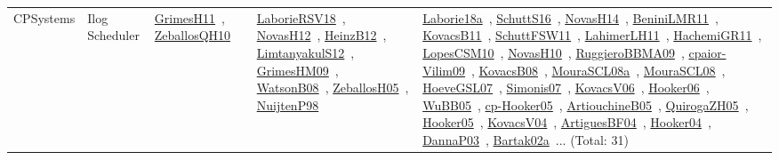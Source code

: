 {\begin{longtable}{lp{3cm}>{\raggedright\arraybackslash}p{6cm}>{\raggedright\arraybackslash}p{6cm}>{\raggedright\arraybackslash}p{8cm}}
CPSystems & Ilog Scheduler & \href{papers/GrimesH11.pdf}{GrimesH11}~\cite{GrimesH11}, \href{articles/ZeballosQH10.pdf}{ZeballosQH10}~\cite{ZeballosQH10} & \href{articles/LaborieRSV18.pdf}{LaborieRSV18}~\cite{LaborieRSV18}, \href{articles/NovasH12.pdf}{NovasH12}~\cite{NovasH12}, \href{papers/HeinzB12.pdf}{HeinzB12}~\cite{HeinzB12}, \href{articles/LimtanyakulS12.pdf}{LimtanyakulS12}~\cite{LimtanyakulS12}, \href{papers/GrimesHM09.pdf}{GrimesHM09}~\cite{GrimesHM09}, \href{papers/WatsonB08.pdf}{WatsonB08}~\cite{WatsonB08}, \href{articles/ZeballosH05.pdf}{ZeballosH05}~\cite{ZeballosH05}, \href{articles/NuijtenP98.pdf}{NuijtenP98}~\cite{NuijtenP98} & \href{papers/Laborie18a.pdf}{Laborie18a}~\cite{Laborie18a}, \href{papers/SchuttS16.pdf}{SchuttS16}~\cite{SchuttS16}, \href{articles/NovasH14.pdf}{NovasH14}~\cite{NovasH14}, \href{articles/BeniniLMR11.pdf}{BeniniLMR11}~\cite{BeniniLMR11}, \href{articles/KovacsB11.pdf}{KovacsB11}~\cite{KovacsB11}, \href{articles/SchuttFSW11.pdf}{SchuttFSW11}~\cite{SchuttFSW11}, \href{papers/LahimerLH11.pdf}{LahimerLH11}~\cite{LahimerLH11}, \href{articles/HachemiGR11.pdf}{HachemiGR11}~\cite{HachemiGR11}, \href{articles/LopesCSM10.pdf}{LopesCSM10}~\cite{LopesCSM10}, \href{articles/NovasH10.pdf}{NovasH10}~\cite{NovasH10}, \href{articles/RuggieroBBMA09.pdf}{RuggieroBBMA09}~\cite{RuggieroBBMA09}, \href{papers/cpaior-Vilim09.pdf}{cpaior-Vilim09}~\cite{cpaior-Vilim09}, \href{articles/KovacsB08.pdf}{KovacsB08}~\cite{KovacsB08}, \href{papers/MouraSCL08a.pdf}{MouraSCL08a}~\cite{MouraSCL08a}, \href{papers/MouraSCL08.pdf}{MouraSCL08}~\cite{MouraSCL08}, \href{papers/HoeveGSL07.pdf}{HoeveGSL07}~\cite{HoeveGSL07}, \href{articles/Simonis07.pdf}{Simonis07}~\cite{Simonis07}, \href{papers/KovacsV06.pdf}{KovacsV06}~\cite{KovacsV06}, \href{articles/Hooker06.pdf}{Hooker06}~\cite{Hooker06}, \href{papers/WuBB05.pdf}{WuBB05}~\cite{WuBB05}, \href{papers/cp-Hooker05.pdf}{cp-Hooker05}~\cite{cp-Hooker05}, \href{papers/ArtiouchineB05.pdf}{ArtiouchineB05}~\cite{ArtiouchineB05}, \href{papers/QuirogaZH05.pdf}{QuirogaZH05}~\cite{QuirogaZH05}, \href{articles/Hooker05.pdf}{Hooker05}~\cite{Hooker05}, \href{papers/KovacsV04.pdf}{KovacsV04}~\cite{KovacsV04}, \href{papers/ArtiguesBF04.pdf}{ArtiguesBF04}~\cite{ArtiguesBF04}, \href{papers/Hooker04.pdf}{Hooker04}~\cite{Hooker04}, \href{papers/DannaP03.pdf}{DannaP03}~\cite{DannaP03}, \href{papers/Bartak02a.pdf}{Bartak02a}~\cite{Bartak02a}... (Total: 31)\\

\end{longtable}}
